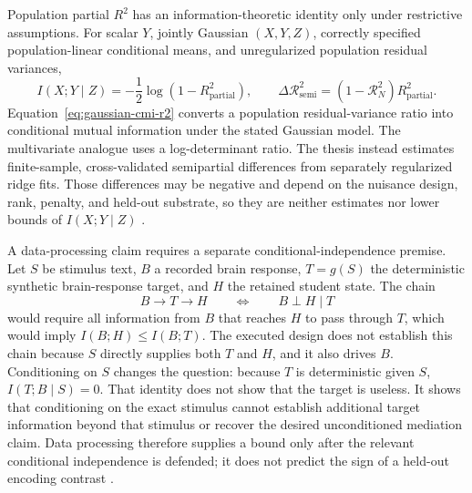 Population partial \(R^2\) has an information-theoretic identity only under restrictive assumptions.
For scalar \(Y\), jointly Gaussian \((X,Y,Z)\), correctly specified population-linear conditional means, and unregularized population residual variances,
\begin{equation}
  I(X;Y\mid Z)
  =
  -\frac{1}{2}\log\!\left(1-R_{\mathrm{partial}}^2\right),
  \qquad
  \Delta\mathcal R_{\mathrm{semi}}^2
  =
  \left(1-\mathcal R_N^2\right)R_{\mathrm{partial}}^2.
  \label{eq:gaussian-cmi-r2}
\end{equation}
Equation~\ref{eq:gaussian-cmi-r2} converts a population residual-variance ratio into conditional mutual information under the stated Gaussian model.
The multivariate analogue uses a log-determinant ratio.
The thesis instead estimates finite-sample, cross-validated semipartial differences from separately regularized ridge fits.
Those differences may be negative and depend on the nuisance design, rank, penalty, and held-out substrate, so they are neither estimates nor lower bounds of \(I(X;Y\mid Z)\) \autocite{cover2006}.

\begin{samepage}
A data-processing claim requires a separate conditional-independence premise.
Let \(S\) be stimulus text, \(B\) a recorded brain response, \(T=g(S)\) the deterministic synthetic brain-response target, and \(H\) the retained student state.
The chain
\[
  B\longrightarrow T\longrightarrow H
  \qquad\Longleftrightarrow\qquad
  B\perp H\mid T
\]
would require all information from \(B\) that reaches \(H\) to pass through \(T\), which would imply \(I(B;H)\leq I(B;T)\).
The executed design does not establish this chain because \(S\) directly supplies both \(T\) and \(H\), and it also drives \(B\).
Conditioning on \(S\) changes the question: because \(T\) is deterministic given \(S\), \(I(T;B\mid S)=0\).
That identity does not show that the target is useless.
It shows that conditioning on the exact stimulus cannot establish additional target information beyond that stimulus or recover the desired unconditioned mediation claim.
Data processing therefore supplies a bound only after the relevant conditional independence is defended; it does not predict the sign of a held-out encoding contrast \autocite{cover2006}. 
\end{samepage}

